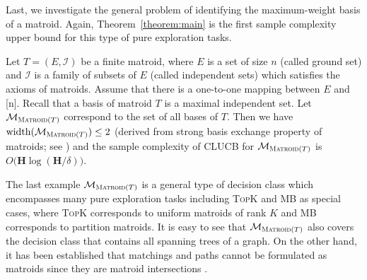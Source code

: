 \documentclass{article}
\newcommand{\junk}[1]{}
\newcommand{\Algorithm}{{\small \textsf{CLUCB}}\xspace}
\newcommand{\M}{\mathcal M}
\newcommand{\del}{\backslash}
\DeclareMathOperator{\rank}{width}
\newcommand{\MultiIdent}{\textsc{TopK}\xspace}
\newcommand{\MultiBandit}{\textsc{MB}\xspace}
\newcommand{\Matroid}{\textsc{Matroid}\xspace}
\newcommand{\Path}{\textsc{Path}\xspace}
\begin{document}
Last, we investigate the general problem of identifying the maximum-weight basis of a matroid.
Again, Theorem~\ref{theorem:main} is the first sample complexity upper bound for this type of pure exploration tasks.
\begin{example}[Matroids]
\label{example:matroid}
Let $T=(E,\mathcal I)$ be a finite matroid, where $E$ is a set of size $n$ (called ground set) and $\mathcal I$ is a family of subsets of $E$ (called independent sets) which satisfies the axioms of matroids.
Assume that there is a one-to-one mapping between $E$ and [n].
Recall that a basis of matroid $T$ is a maximal independent set.
Let $\M_{\Matroid(T)}$ correspond to the set of all bases of $T$.
Then we have $\rank(\M_{\Matroid(T)}) \le 2$ (derived from strong basis exchange property of matroids; see ) and the sample complexity of \Algorithm for $\M_{\Matroid(T)}$ is $O\big(\mathbf H \log(\mathbf H/\delta)\big)$.
\end{example}
The last example $\M_{\Matroid(T)}$ is a general type of decision class which encompasses many pure exploration tasks including \MultiIdent and \MultiBandit as special cases, where \MultiIdent corresponds to uniform matroids of rank $K$ and \MultiBandit corresponds to partition matroids.
It is easy to see that $\M_{\Matroid(T)}$ also covers the decision class that contains all spanning trees of a graph.
On the other hand, it has been established that matchings and paths cannot be formulated as matroids since they are matroid intersections \citep{oxley2006matroid}.

\junk{
The bounds on the width of our examples decision classes are proven by constructing the exchange classes. 
In fact, these exchange classes correspond to natural combinatorial structures. 
We illustrate our constructions in \Cref{fig:exchange}.


}

\end{document}
